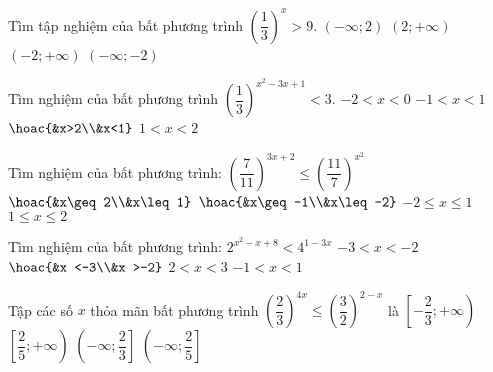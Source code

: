 \begin{ex}%
	Tìm tập nghiệm của bất phương trình $\left(\dfrac{1}{3}\right)^x>9$.
	\choice
	{$(-\infty;2)$}
	{$(2;+\infty)$}
	{$(-2;+\infty)$}
	{\True $(-\infty;-2)$}
\end{ex}
\begin{ex}%
	Tìm nghiệm của bất phương trình $\left(\dfrac{1}{3}\right)^{x^2-3x+1}<3$. 
	\choice
	{$-2<x<0$}
	{$-1<x<1$}
	{\True $\hoac{&x>2\\&x<1}$}
	{$1<x<2$}
\end{ex}
\begin{ex}%
	Tìm nghiệm của bất phương trình: $\left(\dfrac{7}{11}\right)^{3x+2}\leq\left(\dfrac{11}{7}\right)^{x^2}$ 
	\choice
	{$\hoac{&x\geq 2\\&x\leq 1}$}
	{$\hoac{&x\geq-1\\&x\leq-2}$}
	{\True $-2\leq x\leq 1$}
	{$1\leq x\leq 2$}
\end{ex}
\begin{ex}%
	Tìm nghiệm của bất phương trình: $2^{x^2-x+8}<4^{1-3x}$ 
	\choice
	{\True $-3<x <-2$}
	{$\hoac{&x <-3\\&x >-2}$}
	{$2<x<3$}
	{$-1<x<1$}
\end{ex}
\begin{ex}%
	Tập các số $x$ thỏa mãn bất phương trình $\left(\dfrac{2}{3}\right)^{4x}\leq\left(\dfrac{3}{2}\right)^{2-x}$ là 
	\choice
	{\True $\left[-\dfrac{2}{3};+\infty\right)$}
	{$\left[\dfrac{2}{5};+\infty\right)$}
	{$\left(-\infty;\dfrac{2}{3}\right]$}
	{$\left(-\infty;\dfrac{2}{5}\right]$}
\end{ex}
